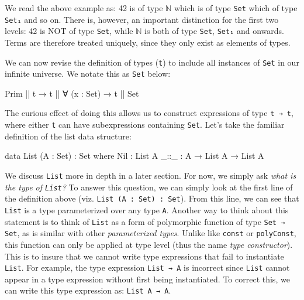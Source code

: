 \documentclass[12pt]{article}
\begin{document}
We read the above example as: 42 is of type \(\mathbb{N}\) which is of type
{\tt Set} which of type {\tt Set₁} and so on. There is, however, an important
distinction for the first two levels: 42 is NOT of type {\tt Set}, while
\(\mathbb{N}\) is both of type {\tt Set}, {\tt Set₁} and onwards. Terms are
therefore treated uniquely, since they only exist as elements of types.

We can now revise the definition of types ({\tt t}) to include all instances of
{\tt Set} in our infinite universe. We notate this as {\tt Set} below:

\begin{center}
\begin{minipage}{0.65\textwidth}
\begin{code}
Prim || t → t || ∀ (x : Set) → t || Set
\end{code}
\end{minipage}
\end{center}
The curious effect of doing this allows us to construct expressions of type
{\tt t → t}, where either {\tt t} can have subexpressions containing {\tt Set}.
Let's take the familiar definition of the list data structure:

\begin{center}
\begin{minipage}{0.65\textwidth}
\begin{code}
data List (A : Set) : Set where
  Nil  : List A
  _::_ : A → List A → List A
\end{code}
\end{minipage}
\end{center}

We discuss {\tt List} more in depth in a later section. For now, we simply ask
{\em what is the type of {\tt List}?} To answer this question, we can simply
look at the first line of the definition above (viz. {\tt List (A : Set) : Set}).
From this line, we can see that {\tt List} is a type parameterized over any type
{\tt A}. Another way to think about this statement is to think of {\tt List} as
a form of polymorphic function of type {\tt Set → Set}, as is similar with other
{\em parameterized types}. Unlike like {\tt const} or {\tt polyConst}, this
function can only be applied at type level (thus the name {\em type constructor}).
This is to insure that we cannot write type expressions that fail to instantiate
{\tt List}. For example, the type expression {\tt List → A} is incorrect since
{\tt List} cannot appear in a type expression without first being instantiated.
To correct this, we can write this type expression as: {\tt List A → A}.
\end{document}
